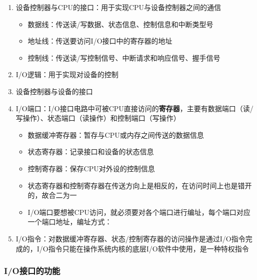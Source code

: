 \documentclass[./computer-organization-and-architecture.tex]{subfiles}
\begin{document}
    \begin{enumerate}
        \item 设备控制器与CPU的接口：用于实现CPU与设备控制器之间的通信
        \begin{itemize}
            \item 数据线：传送读/写数据、状态信息、控制信息和中断类型号
            \item 地址线：传送要访问I/O接口中的寄存器的地址
            \item 控制线：传送读/写控制信号、中断请求和响应信号、握手信号
        \end{itemize}
        \item I/O逻辑：用于实现对设备的控制
        \item 设备控制器与设备的接口
        \item I/O端口：I/O接口电路中可被CPU直接访问的\textbf{寄存器}，主要有数据端口（读/写操作）、状态端口（读操作）和控制端口（写操作）
        \begin{itemize}
            \item 数据缓冲寄存器：暂存与CPU或内存之间传送的数据信息
            \item 状态寄存器：记录接口和设备的状态信息
            \item 控制寄存器：保存CPU对外设的控制信息
            \item 状态寄存器和控制寄存器在传送方向上是相反的，在访问时间上也是错开的，故合二为一
            \item I/O端口要想被CPU访问，就必须要对各个端口进行编址，每个端口对应一个端口地址，编址方式：
        \end{itemize}
        \item I/O指令：对数据缓冲寄存器、状态/控制寄存器的访问操作是通过I/O指令完成的，I/O指令只能在操作系统内核的底层I/O软件中使用，是一种特权指令
    \end{enumerate}

    \subsubsection{I/O接口的功能}
\end{document}
